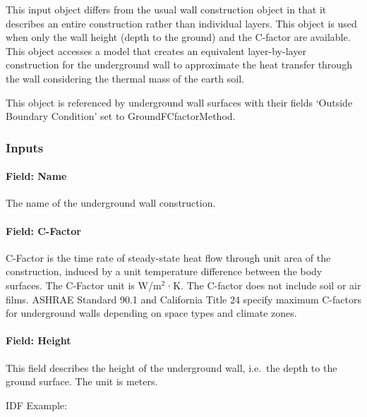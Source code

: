 This input object differs from the usual wall construction object in that it describes an entire construction rather than individual layers. This object is used when only the wall height (depth to the ground) and the C-factor are available.~ This object accesses a model that creates an equivalent layer-by-layer construction for the underground wall to approximate the heat transfer through the wall considering the thermal mass of the earth soil.

This object is referenced by underground wall surfaces with their fields `Outside Boundary Condition' set to GroundFCfactorMethod.

\subsubsection{Inputs}\label{inputs-36}

\paragraph{Field: Name}\label{field-name-29-000}

The name of the underground wall construction.

\paragraph{Field: C-Factor}\label{field-c-factor}

C-Factor is the time rate of steady-state heat flow through unit area of the construction, induced by a unit temperature difference between the body surfaces. The C-Factor unit is W/m\(^{2}\)·K. The C-factor does not include soil or air films. ASHRAE Standard 90.1 and California Title 24 specify maximum C-factors for underground walls depending on space types and climate zones.

\paragraph{Field: Height}\label{field-height}

This field describes the height of the underground wall, i.e.~the depth to the ground surface. The unit is meters.

IDF Example:

